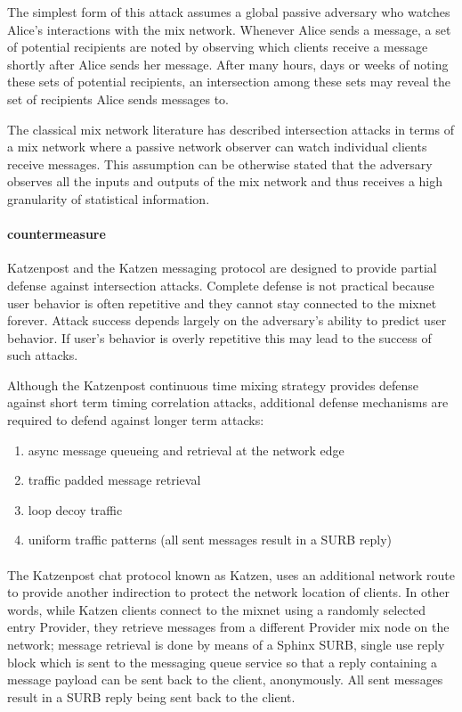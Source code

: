 \documentclass{article}
\begin{document}
The simplest form of this attack assumes a global passive adversary who watches Alice's interactions
with the mix network. Whenever Alice sends a message, a set of potential recipients are noted by observing
which clients receive a message shortly after Alice sends her message. After many
hours, days or weeks of noting these sets of potential recipients, an intersection among these sets may reveal
the set of recipients Alice sends messages to.

The classical mix network literature has described intersection
attacks in terms of a mix network where a passive network
observer can watch individual clients receive messages. This
assumption can be otherwise stated that the adversary observes
all the inputs and outputs of the mix network and thus
receives a high granularity of statistical information. 

\paragraph{countermeasure}

Katzenpost and the Katzen messaging protocol are designed to provide partial defense against intersection attacks.
Complete defense is not practical because user behavior is often repetitive and they cannot stay connected to the mixnet forever.
Attack success depends largely on the adversary's ability to predict user behavior.
If user's behavior is overly repetitive this may lead to the success of such attacks.

Although the Katzenpost continuous time mixing strategy provides defense against short term timing correlation attacks,
additional defense mechanisms are required to defend against longer term attacks:\\

\begin{enumerate}
    \item async message queueing and retrieval at the network edge
    \item traffic padded message retrieval
    \item loop decoy traffic
    \item uniform traffic patterns (all sent messages result in a SURB reply)
\end{enumerate}

\paragraph{}The Katzenpost chat protocol known as Katzen, uses an additional network route
to provide another indirection to protect the network location of clients. In other words,
while Katzen clients connect to the mixnet using a randomly selected entry Provider, they
retrieve messages from a different Provider mix node on the network; message retrieval is done
by means of a Sphinx SURB, single use reply block which is sent to the messaging queue service
so that a reply containing a message payload can be sent back to the client, anonymously.
All sent messages result in a SURB reply being sent back to the client.
\end{document}
